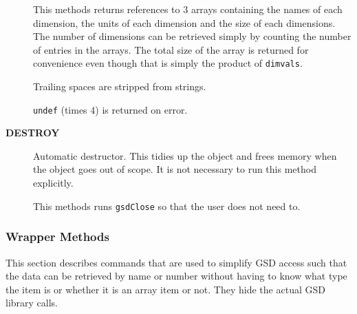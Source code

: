 \documentclass[twoside,11pt]{article}
\renewcommand{\_}{\texttt{\symbol{95}}}
\begin{document}
\begin{description}
This methods returns references to 3 arrays containing the
names of each dimension, the units of each dimension and the
size of each dimensions. The number of dimensions can be
retrieved simply by counting the number of entries in the
arrays. The total size of the array is returned for convenience
even though that is simply the product of \texttt{dimvals}.

Trailing spaces are stripped from strings.

\texttt{undef} (times 4) is returned on error.

\item[\textbf{DESTROY}] \mbox{}

Automatic destructor. This tidies up the object and frees
memory when the object goes out of scope. It is not 
necessary to run this method explicitly.

This methods runs \texttt{gsdClose} so that the user does not
need to.

\end{description}

\subsubsection{Wrapper Methods\label{Wrapper_Methods}}

This section describes commands that are used to simplify GSD
access such that the data can be retrieved by name or number without
having to know what type the item is or whether it is an array item
or not. They hide the actual GSD library calls.
\end{document}
